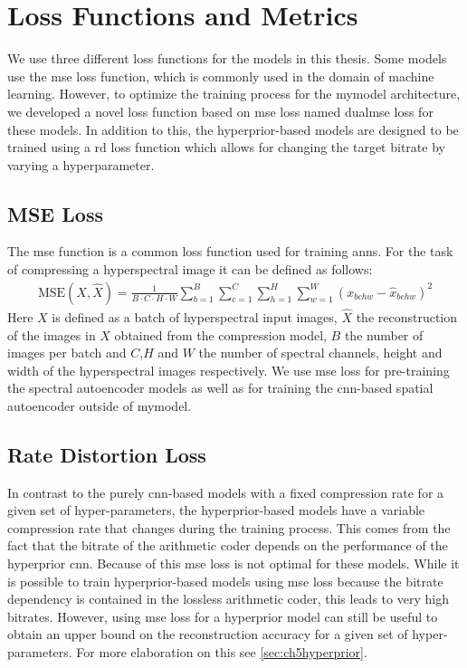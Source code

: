 \section{Loss Functions and Metrics}
We use three different loss functions for the models in this thesis. Some models use the \ac{mse} loss function, which is commonly used in the domain of machine learning. However, to optimize the training process for the \ac{mymodel} architecture, we developed a novel loss function based on \ac{mse} loss named \ac{dualmse} loss for these models. In addition to this, the hyperprior-based models are designed to be trained using a \acf{rd} loss function which allows for changing the target bitrate by varying a hyperparameter.
\subsection{MSE Loss}
The \ac{mse} function is a common loss function used for training \acp{ann}. For the task of compressing a hyperspectral image it can be defined as follows:
\begin{align}
\text{MSE}(X,\hat{X}) = \frac{1}{B\cdot C\cdot H\cdot W} \sum_{b=1}^{B}\sum_{c=1}^{C}\sum_{h=1}^H\sum_{w=1}^W (x_{bchw} - \hat{x}_{bchw})^2
\end{align}
Here $X$ is defined as a batch of hyperspectral input images, $\hat{X}$ the reconstruction of the images in $X$ obtained from the compression model, $B$ the number of images per batch and $C$,$H$ and $W$ the number of spectral channels, height and width of the hyperspectral images respectively.
We use \ac{mse} loss for pre-training the spectral autoencoder models as well as for training the \ac{cnn}-based spatial autoencoder outside of \ac{mymodel}.

\subsection{Rate Distortion Loss\label{sec:ch5ratedistortion}}
In contrast to the purely \ac{cnn}-based models with a fixed compression rate for a given set of hyper-parameters, the hyperprior-based models have a variable compression rate that changes during the training process. This comes from the fact that the bitrate of the arithmetic coder depends on the performance of the hyperprior \ac{cnn}. Because of this \ac{mse} loss is not optimal for these models. While it is possible to train hyperprior-based models using \ac{mse} loss because the bitrate dependency is contained in the lossless arithmetic coder, this leads to very high bitrates. However, using \ac{mse} loss for a hyperprior model can still be useful to obtain an upper bound on the reconstruction accuracy for a given set of hyper-parameters. For more elaboration on this see \autoref{sec:ch5hyperprior}.

